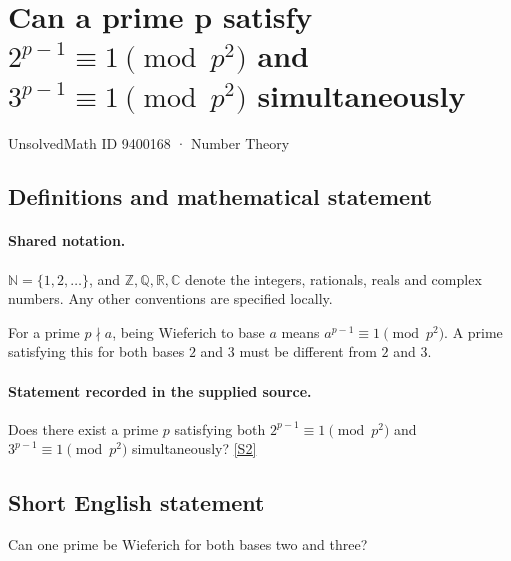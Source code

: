 \documentclass[11pt]{article}
\newcommand{\sref}[2]{\hyperlink{source:#1:#2}{[S#2]}}
\begin{document}
\setcounter{section}{9400167}
\section{\texorpdfstring{Can a prime p satisfy $2^{p-1}\equiv 1\pmod{p^2}$ and $3^{p-1}\equiv 1\pmod{p^2}$ simultaneously}{Can a prime p satisfy 2\textasciicircum{}\{p-1\}congruent to 1pmod\{p\textasciicircum{}2\} and 3\textasciicircum{}\{p-1\}congruent to 1pmod\{p\textasciicircum{}2\} simultaneously}}\label{9400168}
{\small\sffamily UnsolvedMath ID 9400168 · Number Theory}
\subsection{Definitions and mathematical statement}

\paragraph{Shared notation.}$\mathbb N=\{1,2,\ldots\}$, and $\mathbb Z,\mathbb Q,\mathbb R,\mathbb C$ denote the integers, rationals, reals and complex numbers. Any other conventions are specified locally.


For a prime $p\nmid a$, being Wieferich to base $a$ means $a^{p-1}\equiv1\pmod{p^2}$. A prime satisfying this for both bases $2$ and $3$ must be different from $2$ and $3$.
\paragraph{Statement recorded in the supplied source.}
Does there exist a prime $p$ satisfying both $2^{p-1}\equiv1\pmod{p^2}$ and $3^{p-1}\equiv1\pmod{p^2}$ simultaneously? \sref{9400168}{2}
\subsection{Short English statement}
Can one prime be Wieferich for both bases two and three?
\end{document}
